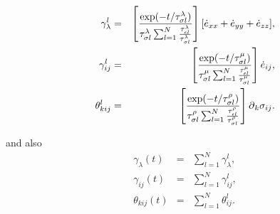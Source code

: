\documentclass[11pt]{article}
\begin{document}
{\begin{eqnarray}
 \gamma^l_{\lambda}    
    & = & \left[\frac{\exp(-t/\tau^{\lambda}_{\sigma l})}
                     {\tau^{\lambda}_{\sigma l}
                     \sum_{l=1}^N \frac{\tau^{\lambda}_{\epsilon l}}
                     {\tau^{\lambda}_{\sigma l}}}\right] 
                     [\dot{e}_{xx}+\dot{e}_{yy}+\dot{e}_{zz}],       \\
 \gamma^l_{ij}    
   & = & \left[\frac{\exp(-t/\tau^{\mu}_{\sigma l})}
                     {\tau^{\mu}_{\sigma l}
                     \sum_{l=1}^N \frac{\tau^{\mu}_{\epsilon l}}
                     {\tau^{\mu}_{\sigma l}}}\right] 
                     \dot{e}_{ij},                                   \\
 \theta^l_{kij}    
   & = & \left[\frac{\exp(-t/\tau^{\rho}_{\sigma l})}
                    {\tau^{\rho}_{\sigma l}
                    \sum_{l=1}^N \frac{\tau^{\rho}_{\epsilon l}}
                    {\tau^{\rho}_{\sigma l}}}\right] 
                    \mbox{$\partial$}_k \sigma_{ij}.
\end{eqnarray}

and also 
\begin{eqnarray}
  \gamma_{\lambda}(t) & = & \sum_{l=1}^N \gamma^l_{\lambda},   \nonumber\\
  \gamma_{ij}(t)      & = & \sum_{l=1}^N \gamma^l_{ij},        \nonumber\\
  \theta_{kij}(t)     & = & \sum_{l=1}^N \theta^l_{ij}.        \nonumber
                           \label{eq:gamma}
\end{eqnarray}

}
\end{document}
